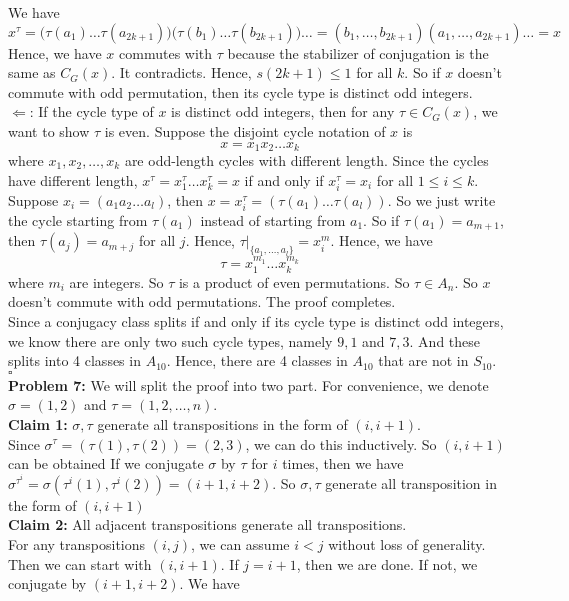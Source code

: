 \documentclass[12pt]{amsart}
\begin{document}
We have 
\[x^\tau=\big(\tau(a_1)\dots \tau(a_{2k+1})\big)\big(\tau(b_1)\dots \tau(b_{2k+1})\big)\dots=(b_1,\dots ,b_{2k+1})(a_1,\dots ,a_{2k+1})\dots=x\]
Hence, we have $x$ commutes with $\tau$ because the stabilizer of conjugation is the same as $C_G(x)$. It contradicts. Hence, $s(2k+1)\leq 1$ for all $k$. So if $x$ doesn't commute with odd permutation, then its cycle type is distinct odd integers.\\
$\Leftarrow$: If the cycle type of $x$ is distinct odd integers, then for any $\tau \in C_G(x)$, we want to show $\tau$ is even. Suppose the disjoint cycle notation of $x$ is 
\[x=x_1x_2\dots x_k\]
where $x_1,x_2,\dots,x_k$ are odd-length cycles with different length. Since the cycles have different length, $x^\tau=x_1^\tau\dots x_k^\tau=x$ if and only if $x_i^\tau =x_i$ for all $1\leq i\leq k$. Suppose $x_i=(a_1a_2\dots a_l)$, then $x=x_i^\tau=(\tau(a_1)\dots \tau(a_l))$. So we just write the cycle starting from $\tau(a_1)$ instead of starting from $a_1$. So if $\tau(a_1)=a_{m+1}$, then $\tau(a_j)=a_{m+j}$ for all $j$. Hence, $\tau|_{\{a_1,\dots,a_l\}}=x_i^m$. Hence, we have 
\[\tau=x_1^{m_1}\dots x_k^{m_k}\]
where $m_i$ are integers. So $\tau$ is a product of even permutations. So $\tau\in A_n$. So $x$ doesn't commute with odd permutations. The proof completes.\\
Since a conjugacy class splits if and only if its cycle type is distinct odd integers, we know there are only two such cycle types, namely $9,1$ and $7,3$. And these splits into 4 classes in $A_{10}$. Hence, there are 4 classes in $A_{10}$ that are not in $S_{10}$.
\\\phantom{qed}\hfill$\square$\\
\textbf{Problem 7:} We will split the proof into two part. For convenience, we denote $\sigma=(1,2)$ and $\tau=(1,2,\dots,n)$. \\
\textbf{Claim 1:} $\sigma,\tau$ generate all transpositions in the form of $(i,i+1)$.\\
Since $\sigma^\tau=(\tau(1),\tau(2))=(2,3)$, we can do this inductively. So $(i,i+1)$ can be obtained If we conjugate $\sigma$ by $\tau$ for $i$ times, then we have $\sigma^{\tau^i}=\sigma(\tau^i(1),\tau^i(2))=(i+1,i+2)$. So $\sigma,\tau$ generate all transposition in the form of $(i,i+1)$\\
\textbf{Claim 2:} All adjacent transpositions generate all transpositions.\\
For any transpositions $(i,j)$, we can assume $i<j$ without loss of generality. Then we can start with $(i,i+1)$. If $j=i+1$, then we are done. If not, we conjugate by $(i+1,i+2)$. We have 
\end{document}
